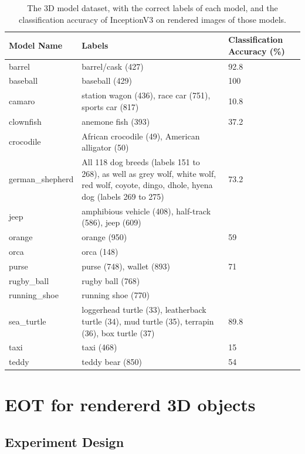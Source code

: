 \begin{table}
\caption{The 3D model dataset, with the correct labels of each model, and the classification accuracy of InceptionV3 on rendered images of those models.}
\label{table:model_labels_accuracy}
\begin{tabular}{|p{2.6cm} | p{8.5cm}| p{2cm}|} 
 \hline
 Model Name & Labels & Classification Accuracy (\%) \\
 \hline
 barrel & barrel/cask (427) & 92.8 \\ 
 \hline
 baseball & baseball (429) & 100 \\
 \hline
 camaro & station wagon (436), race car (751), sports car (817) & 10.8 \\
 \hline
 clownfish & anemone fish (393) & 37.2 \\
 \hline
 crocodile & African crocodile (49), American alligator (50) & \\
 \hline
 german\_shepherd & All 118 dog breeds (labels 151 to 268), as well as grey wolf, white wolf, red wolf, coyote, dingo, dhole, hyena dog (labels 269 to 275) & 73.2 \\
 \hline
 jeep & amphibious vehicle (408), half-track (586), jeep (609) & \\
 \hline
 orange & orange (950) & 59 \\
 \hline
 orca & orca (148) & \\
 \hline
 purse & purse (748), wallet (893) & 71 \\
 \hline
 rugby\_ball & rugby ball (768) & \\
 \hline
 running\_shoe & running shoe (770) & \\
 \hline
 sea\_turtle & loggerhead turtle (33), leatherback turtle (34), mud turtle (35), terrapin (36), box turtle (37) & 89.8 \\
 \hline
 taxi & taxi (468) & 15 \\
 \hline
 teddy & teddy bear (850) & 54 \\
 \hline
\end{tabular}
\end{table}


\section{EOT for rendererd 3D objects}

\subsection{Experiment Design}
    \label{subsec:eot_experiment_design}

